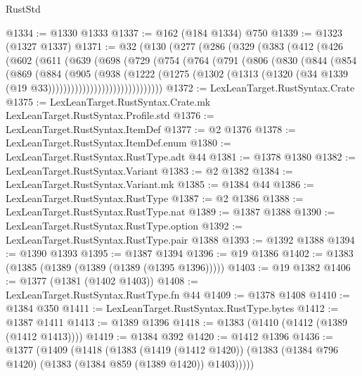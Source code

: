 \begin{lexlean}{RustStd}
\begin{coremodule}
{\begin{coremodule}
{{{{{{{{{{{{{{{{{{{{{{{{{{{{{{{{{{{@1334 := @1330 @1333
@1337 := @162 (@184 @1334) @750
@1339 := @1323 (@1327 @1337)
@1371 := @32
    (@130
      (@277
        (@286
          (@329
            (@383
              (@412
                (@426
                  (@602
                    (@611
                      (@639
                        (@698
                          (@729
                            (@754
                              (@764
                                (@791
                                  (@806
                                    (@830
                                      (@844
                                        (@854
                                          (@869
                                            (@884
                                              (@905
                                                (@938
                                                  (@1222
                                                    (@1275
                                                      (@1302
                                                        (@1313
                                                          (@1320
                                                            (@34
                                                              @1339
                                                              (@19 @33))))))))))))))))))))))))))))))
@1372 := LexLeanTarget.RustSyntax.Crate
@1375 := LexLeanTarget.RustSyntax.Crate.mk LexLeanTarget.RustSyntax.Profile.std
@1376 := LexLeanTarget.RustSyntax.ItemDef
@1377 := @2 @1376
@1378 := LexLeanTarget.RustSyntax.ItemDef.enum
@1380 := LexLeanTarget.RustSyntax.RustType.adt @44
@1381 := @1378 @1380
@1382 := LexLeanTarget.RustSyntax.Variant
@1383 := @2 @1382
@1384 := LexLeanTarget.RustSyntax.Variant.mk
@1385 := @1384 @44
@1386 := LexLeanTarget.RustSyntax.RustType
@1387 := @2 @1386
@1388 := LexLeanTarget.RustSyntax.RustType.nat
@1389 := @1387 @1388
@1390 := LexLeanTarget.RustSyntax.RustType.option
@1392 := LexLeanTarget.RustSyntax.RustType.pair @1388
@1393 := @1392 @1388
@1394 := @1390 @1393
@1395 := @1387 @1394
@1396 := @19 @1386
@1402 := @1383 (@1385 (@1389 (@1389 (@1389 (@1395 @1396)))))
@1403 := @19 @1382
@1406 := @1377 (@1381 (@1402 @1403))
@1408 := LexLeanTarget.RustSyntax.RustType.fn @44
@1409 := @1378 @1408
@1410 := @1384 @350
@1411 := LexLeanTarget.RustSyntax.RustType.bytes
@1412 := @1387 @1411
@1413 := @1389 @1396
@1418 := @1383 (@1410 (@1412 (@1389 (@1412 @1413))))
@1419 := @1384 @392
@1420 := @1412 @1396
@1436 := @1377
    (@1409
      (@1418
        (@1383
          (@1419 (@1412 @1420))
          (@1383 (@1384 @796 @1420) (@1383 (@1384 @859 (@1389 @1420)) @1403)))))
}}}}}}}}}}}}}}}}}}}}}}}}}}}}}}}}}}}
\end{coremodule}}
\end{coremodule}
\end{lexlean}
